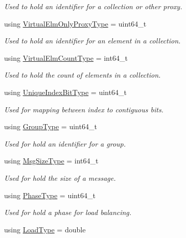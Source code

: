 \begin{DoxyCompactItemize}
\begin{DoxyCompactList}\small\item\em Used to hold an identifier for a collection or other proxy. \end{DoxyCompactList}\item 
using \hyperlink{namespacevt_aa68633cd16822ae31c1cf521f817a23e}{Virtual\+Elm\+Only\+Proxy\+Type} = uint64\+\_\+t
\begin{DoxyCompactList}\small\item\em Used to hold an identifier for an element in a collection. \end{DoxyCompactList}\item 
using \hyperlink{namespacevt_ac115668758184050beff7a9281a2c490}{Virtual\+Elm\+Count\+Type} = int64\+\_\+t
\begin{DoxyCompactList}\small\item\em Used to hold the count of elements in a collection. \end{DoxyCompactList}\item 
using \hyperlink{namespacevt_a913e1f07b5228dd8bb64040dc6dcea14}{Unique\+Index\+Bit\+Type} = uint64\+\_\+t
\begin{DoxyCompactList}\small\item\em Used for mapping between index to contiguous bits. \end{DoxyCompactList}\item 
using \hyperlink{namespacevt_a27b5e4411c9b6140c49100e050e2f743}{Group\+Type} = uint64\+\_\+t
\begin{DoxyCompactList}\small\item\em Used for hold an identifier for a group. \end{DoxyCompactList}\item 
using \hyperlink{namespacevt_a408e86a8c7c89309b52907dc5a513924}{Msg\+Size\+Type} = int64\+\_\+t
\begin{DoxyCompactList}\small\item\em Used for hold the size of a message. \end{DoxyCompactList}\item 
using \hyperlink{namespacevt_a46ce6733d5cdbd735d561b7b4029f6d7}{Phase\+Type} = uint64\+\_\+t
\begin{DoxyCompactList}\small\item\em Used for hold a phase for load balancing. \end{DoxyCompactList}\item 
using \hyperlink{namespacevt_a8fb51741340b87d7aaee0bef60e9896b}{Load\+Type} = double

\end{DoxyCompactItemize}
